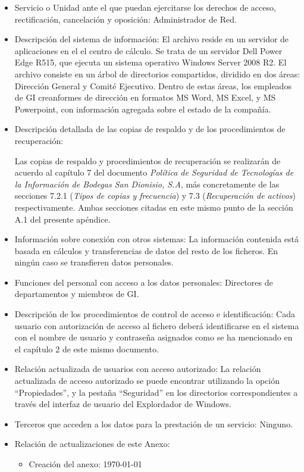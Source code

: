 \documentclass[a4paper,11pt,bibtotoc,noliststotoc]{scrbook}
\begin{document}
\begin{itemize}
\item Servicio o Unidad ante el que puedan ejercitarse los derechos de acceso, rectificación, cancelación y oposición: Administrador de Red.

\item Descripción del sistema de información: El archivo reside en un servidor de aplicaciones en el el centro de cálculo. Se trata de un servidor Dell Power Edge R515, que ejecuta un sistema operativo Windows Server 2008 R2. El archivo consiste en un árbol de directorios compartidos, dividido en dos áreas: Dirección General y Comité Ejecutivo. Dentro de estas áreas, los empleados de GI creanformes de dirección en formatos MS Word, MS Excel, y MS Powerpoint, con información agregada sobre el estado de la compañía.

\item Descripción detallada de las copias de respaldo y de los procedimientos de recuperación:

Las copias de respaldo y procedimientos de recuperación se realizarán de acuerdo al capítulo 7 del documento \emph{Política de Seguridad de Tecnologías de la Información de Bodegas San Dionisio, S.A}, más concretamente de las secciones 7.2.1 (\emph{Tipos de copias y frecuencia}) y 7.3 (\emph{Recuperación de activos}) respectivamente. Ambas secciones citadas en este mismo punto de la sección A.1 del presente apéndice.

\item Información sobre conexión con otros sistemas: La información contenida está basada en cálculos y transferencias de datos del resto de los ficheros. En ningún caso se transfieren datos personales.

\item Funciones del personal con acceso a los datos personales: Directores de departamentos y miembros de GI.

\item Descripción de los procedimientos de control de acceso e identificación: Cada usuario con autorización de acceso al fichero deberá identificarse en el sistema con el nombre de usuario y contraseña asignados como se ha mencionado en el capítulo 2 de este mismo documento.

\item Relación actualizada de usuarios con acceso autorizado: La relación actualizada de acceso autorizado se puede encontrar utilizando la opción "`Propiedades"', y la pestaña "`Seguridad"' en los directorios correspondientes a través del interfaz de usuario del Explordador de Windows.

\item Terceros que acceden a los datos para la prestación de un servicio: Ninguno.

\item Relación de actualizaciones de este Anexo: 

	\begin{itemize}
	\item Creación del anexo: \today
	\end{itemize}

\end{itemize}
\end{document}
